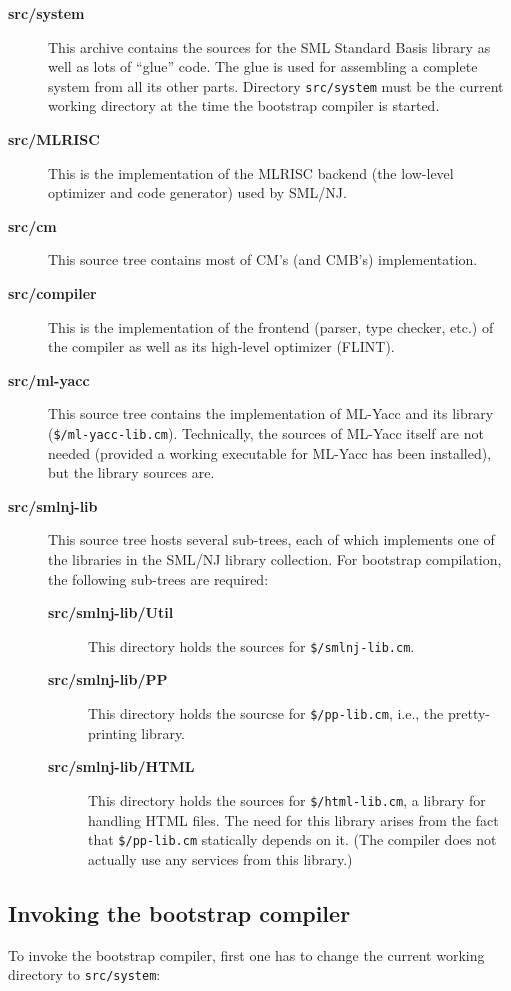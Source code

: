 \begin{description}
\item[{\bf src/system}] This archive contains the sources for the SML
Standard Basis library as well as lots of ``glue'' code.  The glue is
used for assembling a complete system from all its other parts.
Directory {\tt src/system} must be the current working directory at
the time the bootstrap compiler is started.
\item[{\bf src/MLRISC}] This is the implementation of the MLRISC
backend (the low-level optimizer and code generator) used by SML/NJ.
\item[{\bf src/cm}] This source tree contains most of CM's (and CMB's)
implementation.
\item[{\bf src/compiler}] This is the implementation of the frontend
(parser, type checker, etc.) of the compiler as well as its high-level
optimizer (FLINT).
\item[{\bf src/ml-yacc}] This source tree contains the implementation
of ML-Yacc and its library ({\tt \$/ml-yacc-lib.cm}).
Technically, the sources of ML-Yacc itself are not needed (provided a
working executable for ML-Yacc has been installed), but the library
sources are.
\item[{\bf src/smlnj-lib}] This source tree hosts several sub-trees,
each of which implements one of the libraries in the SML/NJ library
collection.  For bootstrap compilation, the following sub-trees are
required:
\begin{description}
\item[{\bf src/smlnj-lib/Util}] This directory holds the sources for
{\tt \$/smlnj-lib.cm}.
\item[{\bf src/smlnj-lib/PP}] This directory holds the sourcse for
{\tt \$/pp-lib.cm}, i.e., the pretty-printing library.
\item[{\bf src/smlnj-lib/HTML}] This directory holds the sources for
{\tt \$/html-lib.cm}, a library for handling HTML files.  The need for
this library arises from the fact that {\tt \$/pp-lib.cm} statically
depends on it.  (The compiler does not actually use any services from
this library.)
\end{description}
\end{description}

\subsection{Invoking the bootstrap compiler}

To invoke the bootstrap compiler, first one has to change the current
working directory to {\tt src/system}:

